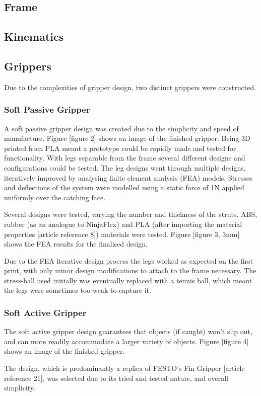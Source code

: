 \documentclass[conference]{IEEEtran}
\begin{document}
\subsection{Frame}
\subsection{Kinematics}
\subsection{Grippers}
Due to the complexities of gripper design, two distinct grippers were constructed.
\subsubsection{Soft Passive Gripper}
A soft passive gripper design was created due to the simplicity and speed of manufacture. Figure [figure 2] shows an image of the finished gripper.
Being 3D printed from PLA meant a prototype could be rapidly made and tested for functionality. With legs separable from the frame several different designs and configurations could be tested. The leg designs went through multiple designs, iteratively improved by analysing finite element analysis (FEA) models. Stresses and deflections of the system were modelled using a static force of 1N applied uniformly over the catching face.

Several designs were tested, varying the number and thickness of the struts. ABS, rubber (as an analogue to NinjaFlex) and PLA (after importing the material properties [article reference 8]) materials were tested. Figure [figure 3, 3mm] shows the FEA results for the finalised design.

Due to the FEA iterative design process the legs worked as expected on the first print, with only minor design modifications to attach to the frame necessary. The stress-ball used initially was eventually replaced with a tennis ball, which meant the legs were sometimes too weak to capture it. 
\subsubsection{Soft Active Gripper}
The soft active gripper design guarantees that objects (if caught) won’t slip out, and can more readily accommodate a larger variety of objects. Figure [figure 4] shows an image of the finished gripper.

The design, which is predominantly a replica of FESTO’s Fin Gripper [article reference 21], was selected due to its tried and tested nature, and overall simplicity. 
\end{document}
